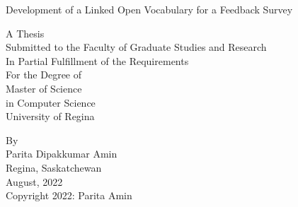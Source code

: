 \documentclass[12pt]{report}
\theoremstyle{definition}
\begin{document}
\begin{titlepage}
    \begin{center}
    \begin{doublespace}
        \vspace*{3cm}

        \large
			Development of a Linked Open Vocabulary for a Feedback Survey

        \vspace{1cm}

        \large
        A Thesis\\
        Submitted to the Faculty of Graduate Studies and Research\\
        In Partial Fulfillment of the Requirements\\
        For the Degree of\\
        Master of Science\\
        in Computer Science\\
        University of Regina\\

        \vspace{0.8cm}

        \normalsize
        By\\
        Parita Dipakkumar Amin\\
        Regina, Saskatchewan\\
        August, 2022\\

        \vspace{0.8cm}
        \textcopyright \hspace*{0.2cm} Copyright 2022: Parita Amin%
    \end{doublespace}
    \end{center}
\end{titlepage}

\newpage
{}


\newpage
{}

\end{document}

